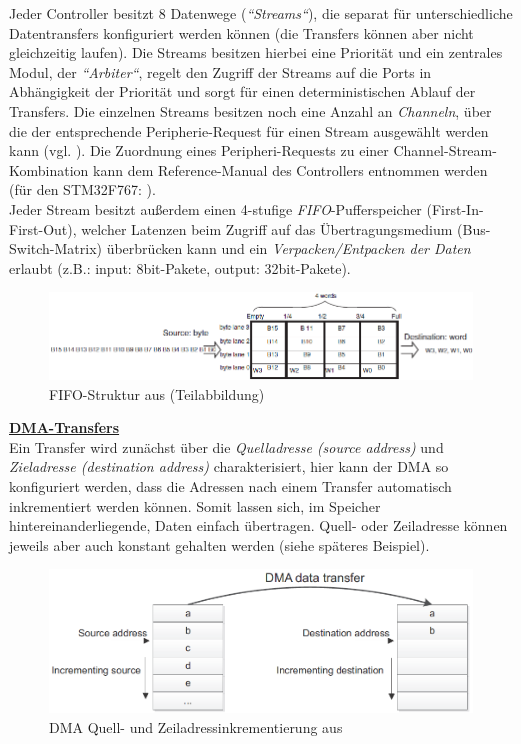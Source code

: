 \documentclass[a4paper, portrait, 12pt]{scrartcl} %
\begin{document}
Jeder Controller besitzt 8 Datenwege (\emph{``Streams``}), die separat für unterschiedliche Datentransfers konfiguriert werden können (die Transfers können aber nicht gleichzeitig laufen). Die Streams besitzen hierbei eine Priorität und ein zentrales Modul, der \emph{``Arbiter``}, regelt den Zugriff der Streams auf die Ports in Abhängigkeit der Priorität und sorgt für einen deterministischen Ablauf der Transfers. Die einzelnen Streams besitzen noch eine Anzahl an \emph{Channeln}, über die der entsprechende Peripherie-Request für einen Stream ausgewählt werden kann (vgl. \cite[S. 7ff]{STmicroelectronics2016}). Die Zuordnung eines Peripheri-Requests zu einer Channel-Stream-Kombination kann dem Reference-Manual des Controllers entnommen werden (für den STM32F767: \cite[S. 252]{STmicroelectronics2024}).\\

Jeder Stream besitzt außerdem einen 4-stufige \emph{FIFO}-Pufferspeicher (First-In-First-Out), welcher Latenzen beim Zugriff auf das Übertragungsmedium (Bus-Switch-Matrix) überbrücken kann und ein \emph{Verpacken/Entpacken der Daten} erlaubt (z.B.: input: 8bit-Pakete, output: 32bit-Pakete).

\begin{figure}[H]
	\centering
    \includegraphics[scale=0.6]{STM32_DMA_FIFO.png} 
	\caption{FIFO-Struktur aus \cite[S. 11]{STmicroelectronics2016} (Teilabbildung)}
	\label{fig:dma_fifo}
\end{figure}
\pagebreak

\textbf{\underline{DMA-Transfers}}\\
Ein Transfer wird zunächst über die \emph{Quelladresse (source address)} und \emph{Zieladresse (destination address)} charakterisiert, hier kann der DMA so konfiguriert werden, dass die Adressen nach einem Transfer automatisch inkrementiert werden können. Somit lassen sich, im Speicher hintereinanderliegende, Daten einfach übertragen. Quell- oder Zeiladresse können jeweils aber auch konstant gehalten werden (siehe späteres Beispiel).

\begin{figure}[H]
	\centering
    \includegraphics[scale=0.6]{STM32_DMA_transfer_incrementing.png} 
	\caption{DMA Quell- und Zeiladressinkrementierung aus \cite[S. 10]{STmicroelectronics2016}}
	\label{fig:dma_transfer_inc}
\end{figure}
\end{document}
